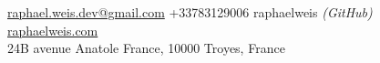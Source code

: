 \documentclass[10pt,a4paper]{article} %
\begin{document}


\noindent\href{mailto:raphael.weis.dev@gmail.com}{raphael.weis.dev@gmail.com}\bull %
+33783129006\bull
raphaelweis \textit{(GitHub)}\bull %
\href{https://raphaelweis.com}{raphaelweis.com}\\ %
24B avenue Anatole France, 10000 Troyes, France %

\spacedhrule{0.9em}{-0.4em} %



%
%
%
%
\end{document}
